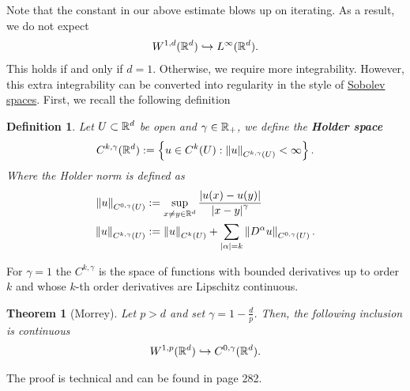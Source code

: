 \documentclass[12pt]{article}
\newtheorem{theorem}{Theorem}
\newtheorem{definition}{Definition}
\theoremstyle{remark}
\renewcommand{\norm}[1]{\left\lVert #1 \right\rVert}\renewcommand{\abs}[1]{\left| #1 \right|}
\begin{document}
Note that the constant in our above estimate blows up on iterating. As a result, we do not expect
\begin{align*}
	W^{1,d}(\mathbb{R}^d) \hookrightarrow L^\infty(\mathbb{R}^d).
\end{align*}
This holds if and only if $d=1$. Otherwise, we require more integrability. However, this extra integrability can be converted into regularity in the style of \href{https://nowheredifferentiable.com/2023-01-29-PDE-1-Fourier/#:~:text=.%C2%A0%E2%97%BB-,As%20a%20corollary,-of%20this%2C%20we}{Sobolev spaces}. First, we recall the following definition
\begin{definition}
	Let $U \subset \mathbb{R}^d$ be open and $\gamma \in \mathbb{R}_+$, we define the \textbf{Holder space}
	\begin{align*}
		C^{k,\gamma }(\R^d):= \set{u \in C^k(U): \norm{u}_{C^{k,\gamma }(U)}<\infty} .
	\end{align*}
	Where the Holder norm is defined as
	\begin{align*}
		\norm{u}_{C^{0,\gamma }(U)} & := \sup_{x \neq y \in \R^d} \frac{\abs{u(x)-u(y)} }{\abs{x-y}^\gamma  }                \\
		\norm{u}_{C^{k,\gamma }(U)} & :=\norm{u}_{C^{k}(U)}+\sum_{\abs{\alpha}= k } \norm{D^\alpha u}_{C^{0,\gamma }(U)}   .
	\end{align*}
\end{definition}
For $\gamma =1$ the $C^{k,\gamma }$ is the space of functions with bounded derivatives up to order $k$ and whose $k$-th order derivatives are Lipschitz continuous.


\begin{theorem}[Morrey]\label{est3}
	Let $p>d$ and set $\gamma=1-\frac{d}{p}$. Then, the following inclusion is continuous
	\begin{align*}
		W^{1,p}(\mathbb{R}^d) \hookrightarrow C^{0,\gamma }(\mathbb{R}^d).
	\end{align*}


\end{theorem}
The proof is technical and can be found in \cite{brezis2011functional} page 282.
\end{document}
